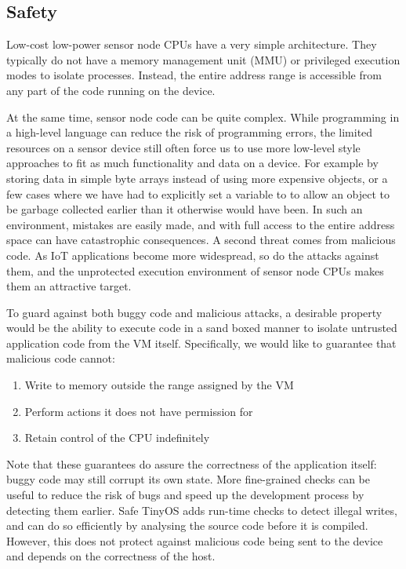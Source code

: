 \subsection{Safety}
\label{sec-introduction-safety}
Low-cost low-power sensor node CPUs have a very simple architecture. They typically do not have a memory management unit (MMU) or privileged execution modes to isolate processes. Instead, the entire address range is accessible from any part of the code running on the device.

At the same time, sensor node code can be quite complex. While programming in a high-level language can reduce the risk of programming errors, the limited resources on a sensor device still often force us to use more low-level style approaches to fit as much functionality and data on a device. For example by storing data in simple byte arrays instead of using more expensive objects, or a few cases where we have had to explicitly set a variable to  to allow an object to be garbage collected earlier than it otherwise would have been. In such an environment, mistakes are easily made, and with full access to the entire address space can have catastrophic consequences. A second threat comes from malicious code. As IoT applications become more widespread, so do the attacks against them, and the unprotected execution environment of sensor node CPUs makes them an attractive target.

To guard against both buggy code and malicious attacks, a desirable property would be the ability to execute code in a sand boxed manner to isolate untrusted application code from the VM itself. Specifically, we would like to guarantee that malicious code cannot:
\begin{enumerate}
    \item Write to memory outside the range assigned by the VM
    \item Perform actions it does not have permission for
    \item Retain control of the CPU indefinitely
\end{enumerate}

Note that these guarantees do assure the correctness of the application itself: buggy code may still corrupt its own state. More fine-grained checks can be useful to reduce the risk of bugs and speed up the development process by detecting them earlier. Safe TinyOS \cite{Cooprider:2007ub} adds run-time checks to detect illegal writes, and can do so efficiently by analysing the source code before it is compiled. However, this does not protect against malicious code being sent to the device and depends on the correctness of the host.

